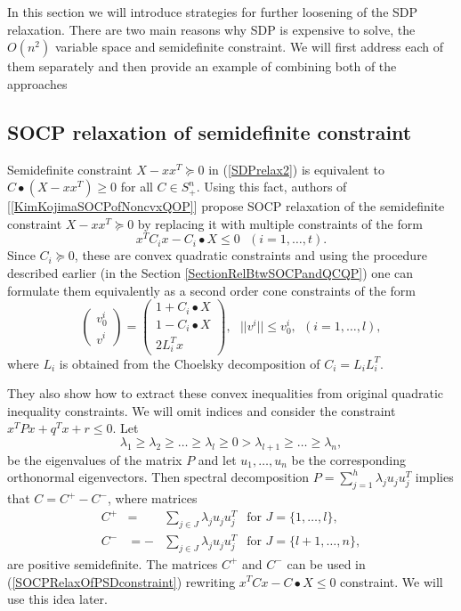 \documentclass[12pt]{book}
\theoremstyle{definition}
\begin{document}
In this section we will introduce strategies for further loosening of the SDP relaxation. There are two main reasons why SDP is expensive to solve, the $O(n^2)$ variable space and semidefinite constraint. We will first address each of them separately and then provide an example of combining both of the approaches

\subsection{SOCP relaxation of semidefinite constraint}

Semidefinite constraint $X-xx^T\succeq 0$  in (\ref{SDPrelax2}) is equivalent to $C\bullet(X-xx^T)\geq 0$ for all $C\in S^n_+$. Using this fact, authors of  [\ref{KimKojimaSOCPofNoncvxQOP}] propose SOCP relaxation of the semidefinite constraint $X-xx^T\succeq 0$ by replacing it with multiple constraints of the form 
\begin{equation}
\label{SOCPrelaxedSemidefiniteConstraint}
x^TC_ix-C_i\bullet X \leq 0 \ \ \ (i=1,\dots ,t).
\end{equation}
Since $C_i\succeq 0$, these are convex quadratic constraints and using the procedure described earlier (in the Section \ref{SectionRelBtwSOCPandQCQP}) one can formulate them equivalently as a second order cone constraints of the form
\begin{equation}
\label{SOCPRelaxOfPSDconstraint}
\left(\begin{array}{c}
v^i_0\\
v^i
\end{array}\right)
= \left(\begin{array}{c}
1+C_i\bullet X\\
1-C_i\bullet X \\
2L_i^Tx
\end{array}\right), \ \ \ ||v^i||\leq v^i_0, \ \ (i  = 1,\dots ,l),
\end{equation}
where $L_i$ is obtained from the Choelsky decomposition of $C_i = L_iL_i^T.$

 They also show how to extract these convex inequalities from original quadratic inequality constraints. 
 We will omit indices and consider the constraint $x^TPx + q^Tx + r \leq 0$. Let
\begin{equation}
\label{SOCPeigenVals}
\lambda_1 \geq \lambda_2 \geq \dots \geq \lambda_l \geq 0 > \lambda_{l+1} \geq \dots \geq \lambda_n,
\end{equation}
be the eigenvalues of the matrix $P$ and let $u_1,\dots, u_n$ be the corresponding orthonormal eigenvectors.
Then spectral decomposition $P = \sum_{j = 1}^{h}\lambda_j u_ju_j^T$ implies that $C = C^+ - C^-$, where matrices
\begin{eqnarray*}
C^+  &=  &  \sum_{j \in J} \lambda_j  u_ju_j^T \ \ \mbox{ for } J = \{ 1,\dots , l\}, \\
C^-  &=  - & \sum_{j \in J} \lambda_j u_ju_j^T \ \ \mbox{ for } J = \{ l+1,\dots , n\},
\end{eqnarray*}
are positive semidefinite. The matrices $C^+$ and $C^-$ can be used in (\ref{SOCPRelaxOfPSDconstraint}) rewriting $x^TCx-C\bullet X \leq 0$ constraint. We will use this idea later.
\end{document}

